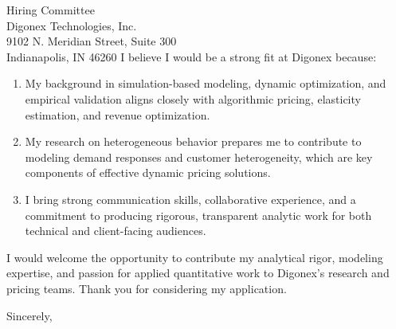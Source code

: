 \documentclass[11pt,letterpaper]{letter}
\begin{document}
\begin{letter}{Hiring Committee \\
Digonex Technologies, Inc. \\
9102 N. Meridian Street, Suite 300 \\
Indianapolis, IN 46260}
I believe I would be a strong fit at Digonex because:
\begin{enumerate}
    \item My background in simulation-based modeling, dynamic optimization, and empirical validation aligns closely with algorithmic pricing, elasticity estimation, and revenue optimization.
    \item My research on heterogeneous behavior prepares me to contribute to modeling demand responses and customer heterogeneity, which are key components of effective dynamic pricing solutions.
    \item I bring strong communication skills, collaborative experience, and a commitment to producing rigorous, transparent analytic work for both technical and client-facing audiences.
\end{enumerate}

I would welcome the opportunity to contribute my analytical rigor, modeling expertise, and passion for applied quantitative work to Digonex’s research and pricing teams. Thank you for considering my application.

\closing{Sincerely,}

\end{letter}
\end{document}
